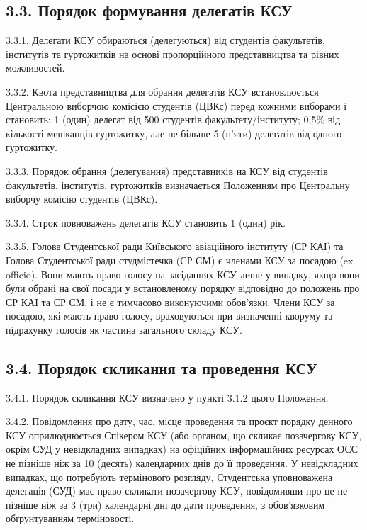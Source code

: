 \subsection*{3.3. Порядок формування делегатів КСУ}
    3.3.1. Делегати КСУ обираються (делегуються) від студентів факультетів, інститутів та гуртожитків на основі пропорційного представництва та рівних можливостей.

    3.3.2. Квота представництва для обрання делегатів КСУ встановлюється Центральною виборчою комісією студентів (ЦВКс) перед кожними виборами і становить: 1 (один) делегат від 500 студентів факультету/інституту; 0,5\% від кількості мешканців гуртожитку, але не більше 5 (п'яти) делегатів від одного гуртожитку.

    3.3.3. Порядок обрання (делегування) представників на КСУ від студентів факультетів, інститутів, гуртожитків визначається Положенням про Центральну виборчу комісію студентів (ЦВКс).

    3.3.4. Строк повноважень делегатів КСУ становить 1 (один) рік.

    3.3.5. Голова Студентської ради Київського авіаційного інституту (СР КАІ) та Голова Студентської ради студмістечка (СР СМ) є членами КСУ за посадою (ex officio). Вони мають право голосу на засіданнях КСУ лише у випадку, якщо вони були обрані на свої посади у встановленому порядку відповідно до положень про СР КАІ та СР СМ, і не є тимчасово виконуючими обов'язки. Члени КСУ за посадою, які мають право голосу, враховуються при визначенні кворуму та підрахунку голосів як частина загального складу КСУ.

\subsection*{3.4. Порядок скликання та проведення КСУ}
    3.4.1. Порядок скликання КСУ визначено у пункті 3.1.2 цього Положення.

    3.4.2. Повідомлення про дату, час, місце проведення та проєкт порядку денного КСУ оприлюднюється Спікером КСУ (або органом, що скликає позачергову КСУ, окрім СУД у невідкладних випадках) на офіційних інформаційних ресурсах ОСС не пізніше ніж за 10 (десять) календарних днів до її проведення. У невідкладних випадках, що потребують термінового розгляду, Студентська уповноважена делегація (СУД) має право скликати позачергову КСУ, повідомивши про це не пізніше ніж за 3 (три) календарні дні до дати проведення, з обов'язковим обґрунтуванням терміновості.

